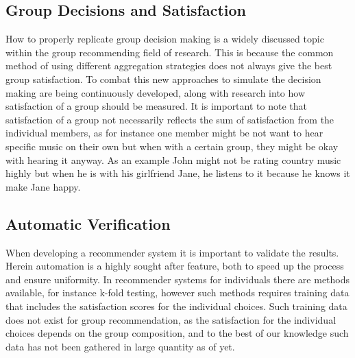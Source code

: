 \subsection{Group Decisions and Satisfaction}
How to properly replicate group decision making is a widely discussed topic within the group recommending field of research. This is because the common method of using different aggregation strategies does not always give the best group satisfaction. To combat this new approaches to simulate the decision making are being continuously developed, along with research into how satisfaction of a group should be measured. It is important to note that satisfaction of a group not necessarily reflects the sum of satisfaction from the individual members, as for instance one member might be not want to hear specific music on their own but when with a certain group, they might be okay with hearing it anyway. As an example John might not be rating country music highly but when he is with his girlfriend Jane, he listens to it because he knows it make Jane happy.

\subsection{Automatic Verification}
When developing a recommender system it is important to validate the results. Herein automation is a highly sought after feature, both to speed up the process and ensure uniformity. In recommender systems for individuals there are methods available, for instance k-fold testing, however such methods requires training data that includes the satisfaction scores for the individual choices. Such training data does not exist for group recommendation, as the satisfaction for the individual choices depends on the group composition, and to the best of our knowledge such data has not been gathered in large quantity as of yet.